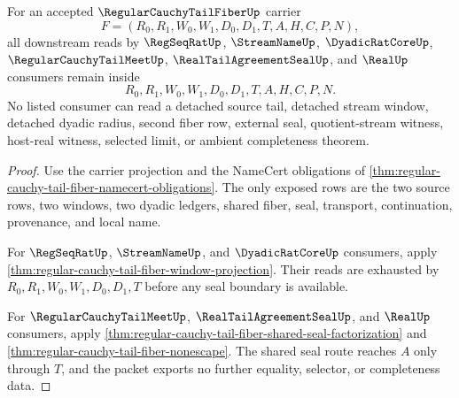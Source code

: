 \begin{theorem}
\label{thm:regular-cauchy-tail-fiber-seal-consumer-exhaustion}
For an accepted $\RegularCauchyTailFiberUp$ carrier
$$
F=(R_0,R_1,W_0,W_1,D_0,D_1,T,A,H,C,P,N),
$$
all downstream reads by $\RegSeqRatUp$, $\StreamNameUp$, $\DyadicRatCoreUp$, $\RegularCauchyTailMeetUp$, $\RealTailAgreementSealUp$, and $\RealUp$ consumers remain inside
$$
R_0,R_1,W_0,W_1,D_0,D_1,T,A,H,C,P,N.
$$
No listed consumer can read a detached source tail, detached stream window, detached dyadic radius, second fiber row, external seal, quotient-stream witness, host-real witness, selected limit, or ambient completeness theorem.
\end{theorem}
\begin{proof}
Use the carrier projection and the NameCert obligations of \autoref{thm:regular-cauchy-tail-fiber-namecert-obligations}. The only exposed rows are the two source rows, two windows, two dyadic ledgers, shared fiber, seal, transport, continuation, provenance, and local name.

For $\RegSeqRatUp$, $\StreamNameUp$, and $\DyadicRatCoreUp$ consumers, apply \autoref{thm:regular-cauchy-tail-fiber-window-projection}. Their reads are exhausted by $R_0,R_1,W_0,W_1,D_0,D_1,T$ before any seal boundary is available.

For $\RegularCauchyTailMeetUp$, $\RealTailAgreementSealUp$, and $\RealUp$ consumers, apply \autoref{thm:regular-cauchy-tail-fiber-shared-seal-factorization} and \autoref{thm:regular-cauchy-tail-fiber-nonescape}. The shared seal route reaches $A$ only through $T$, and the packet exports no further equality, selector, or completeness data.
\end{proof}

